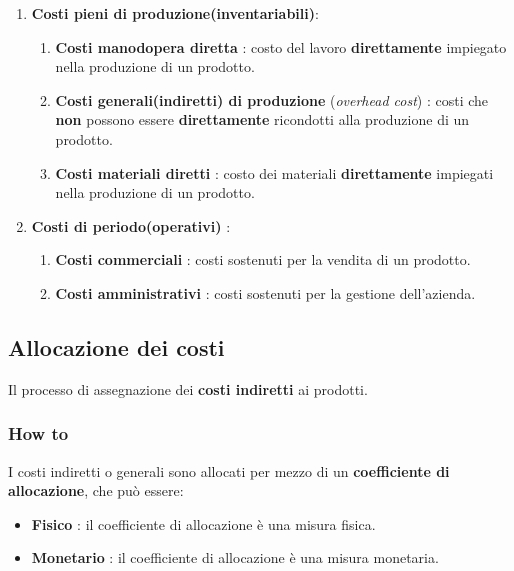 \documentclass[a4paper,10pt]{article}
\begin{document}
\begin{enumerate}
    \item \textbf{Costi pieni di produzione(inventariabili)}:
          \begin{enumerate}
              \item \textbf{Costi manodopera diretta} : costo del lavoro \textbf{direttamente} impiegato nella produzione di un prodotto.
              \item \textbf{Costi generali(indiretti) di produzione} (\textit{overhead cost}) : costi che \textbf{non} possono essere \textbf{direttamente} ricondotti alla produzione di un prodotto.
              \item \textbf{Costi materiali diretti} : costo dei materiali \textbf{direttamente} impiegati nella produzione di un prodotto.
          \end{enumerate}
    \item \textbf{Costi di periodo(operativi)} :
          \begin{enumerate}
              \item \textbf{Costi commerciali} : costi sostenuti per la vendita di un prodotto.
              \item \textbf{Costi amministrativi} : costi sostenuti per la gestione dell’azienda.
          \end{enumerate}
\end{enumerate}

\subsection{Allocazione dei costi}
Il processo di assegnazione dei \textbf{costi indiretti} ai prodotti.
\subsubsection{How to}
I costi indiretti o generali sono allocati per mezzo di un \textbf{coefficiente di allocazione}, che può essere:
\begin{itemize}
    \item \textbf{Fisico} : il coefficiente di allocazione è una misura fisica.
    \item \textbf{Monetario} : il coefficiente di allocazione è una misura monetaria.
\end{itemize}

\setlength{\extrarowheight}{5pt} 
\begin{table}[H]
    \setlength{\extrarowheight}{12pt}
\end{table}
\end{document}
